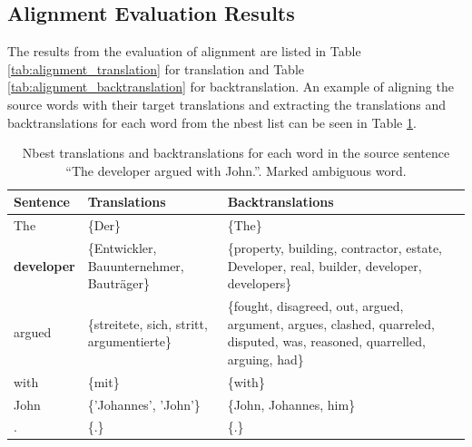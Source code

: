 \clearpage

\subsection{Alignment Evaluation Results}
\label{ch:Base_Experiment:Results:Alignment}

The results from the evaluation of alignment are listed in Table \ref{tab:alignment_translation} for translation and Table \ref{tab:alignment_backtranslation} for backtranslation. An example of aligning the source words with their target translations and extracting the translations and backtranslations for each word from the nbest list can be seen in Table \ref{tab:alignment_example}.

\begin{table}[!htb]
    \centering
    \begin{tabularx}{\textwidth}{|l|X|X|}
        \hline
        \textbf{Sentence}  & \textbf{Translations} & \textbf{Backtranslations} \\ \hline
        The & \{Der\} & \{The\} \\ 
        \textbf{developer} & \{Entwickler, Bauunternehmer, Bauträger\} & \{property, building, contractor, estate, Developer, real, builder, developer, developers\} \\ 
        argued & \{streitete, sich, stritt, argumentierte\} & \{fought, disagreed, out, argued, argument, argues, clashed, quarreled, disputed, was, reasoned, quarrelled, arguing, had\} \\ 
        with & \{mit\} & \{with\} \\ 
        John & \{'Johannes', 'John'\} & \{John, Johannes, him\} \\ 
        . & \{.\} & \{.\} \\ \hline
    \end{tabularx}
    \caption[Translations and backtranslations for each word in the source sentence “The developer argued with John.”]{Nbest translations and backtranslations for each word in the source sentence “The developer argued with John.”. Marked ambiguous word.}
    \label{tab:alignment_example}
\end{table}


